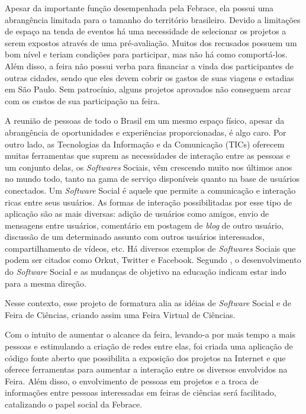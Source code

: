 Apesar da importante função desempenhada pela Febrace, ela possui uma abrangência limitada para o tamanho do território brasileiro. Devido a limitações de espaço na tenda de eventos há uma necessidade de selecionar os projetos a serem expostos através de uma pré-avaliação. Muitos dos recusados possuem um bom nível e teriam condições para participar, mas não há como comportá-los. Além disso, a feira não possui verba para financiar a vinda dos participantes de outras cidades, sendo que eles devem cobrir os gastos de suas viagens e estadias em São Paulo. Sem patrocínio, alguns projetos aprovados não conseguem arcar com os custos de sua participação na feira.

A reunião de pessoas de todo o Brasil em um mesmo espaço físico, apesar da abrangência de oportunidades e experiências proporcionadas, é algo caro. Por outro lado, as Tecnologias da Informação e da Comunicação (TICs) oferecem muitas ferramentas que suprem as necessidades de interação entre as pessoas e um conjunto delas, os \textit{Softwares} Sociais, vêm crescendo muito nos últimos anos no mundo todo, tanto na gama de serviço disponíveis quanto na base de usuários conectados. Um \textit{Software} Social é aquele que permite a comunicação e interação ricas entre seus usuários. As formas de interação possibilitadas por esse tipo de aplicação são as mais diversas: adição de usuários como amigos, envio de mensagens entre usuários, comentário em postagem de \textit{blog} de outro usuário, discussão de um determinado assunto com outros usuários interessados, compartilhamento de vídeos, etc. Há diversos exemplos de \textit{Softwares} Sociais que podem ser citados como Orkut, Twitter e Facebook. Segundo , o desenvolvimento do \textit{Software} Social e as mudanças de objetivo na educação indicam estar indo para a mesma direção.

Nesse contexto, esse projeto de formatura alia as idéias de \textit{Software} Social e de Feira de Ciências, criando assim uma Feira Virtual de Ciências. 

Com o intuito de aumentar o alcance da feira, levando-a por mais tempo a mais pessoas e estimulando a criação de redes entre elas, foi criada uma aplicação de código fonte aberto que possibilita a exposição dos projetos na Internet e que oferece ferramentas para aumentar a interação entre os diversos envolvidos na Feira. Além disso, o envolvimento de pessoas em projetos e a troca de informações entre pessoas interessadas em feiras de ciências será facilitado, catalizando o papel social da Febrace.
